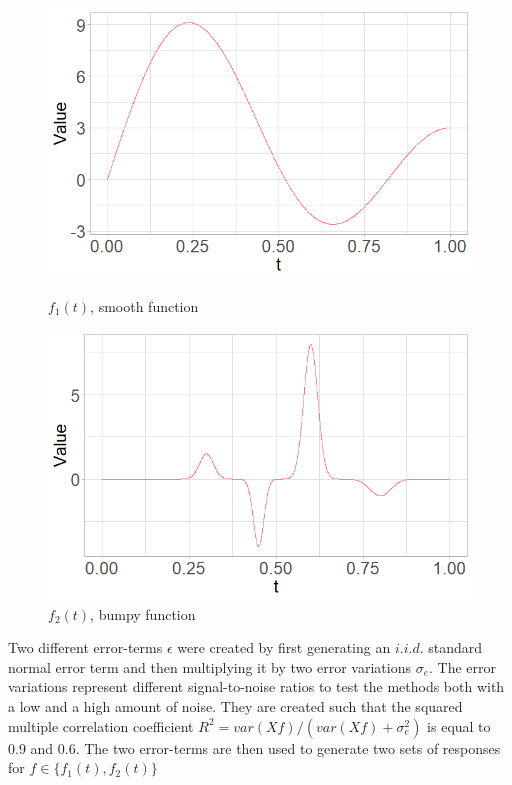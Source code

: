 \documentclass[11pt,twoside,a4paper]{article}
\begin{document}
		\vspace{0.1cm}
		\begin{figure}
			\centering
			\begin{minipage}{.5\textwidth}
				\centering
  				\includegraphics[width=\textwidth]{../Graphics/smooth_function.png}
  				\caption{$f_1(t)$, smooth function}
  				\label{fig:test1}
			\end{minipage}%
			\begin{minipage}{.5\textwidth}
	  			\centering
  				\includegraphics[width=\textwidth]{../Graphics/bumpy_function.png}
  				\caption{$f_2(t)$, bumpy function}
  				\label{fig:test2}
			\end{minipage}
		\end{figure}
		
		 Two different error-terms $\epsilon$ were created by first generating an $i.i.d.$ standard normal error term and then multiplying it by two error variations $\sigma_e $. The error variations represent different signal-to-noise ratios to test the methods both with a low and a high amount of noise. They are created such that the squared multiple correlation coefficient $R^2 = var(Xf) / (var(Xf) + \sigma^2_{e})$ is equal to 0.9 and 0.6. The two error-terms are then used to generate two sets of responses for $f \in \{f_1(t), f_2(t)\}$
		
\end{document}
